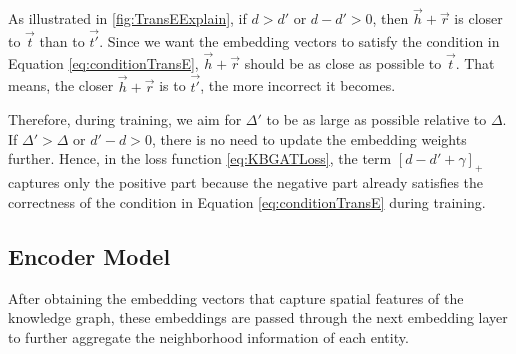 As illustrated in \autoref{fig:TransEExplain}, if $d > d'$ or $d - d' > 0$, then $\overrightarrow{h} + \overrightarrow{r}$ is closer to $\overrightarrow{t}$ than to $\overrightarrow{t'}$. Since we want the embedding vectors to satisfy the condition in Equation \ref{eq:conditionTransE}, $\overrightarrow{h} + \overrightarrow{r}$ should be as close as possible to $\overrightarrow{t}$. That means, the closer $\overrightarrow{h} + \overrightarrow{r}$ is to $\overrightarrow{t'}$, the more incorrect it becomes.

Therefore, during training, we aim for $\Delta'$ to be as large as possible relative to $\Delta$. If $\Delta' > \Delta$ or $d' - d > 0$, there is no need to update the embedding weights further. Hence, in the loss function \ref{eq:KBGATLoss}, the term $[d - d' + \gamma]_{+}$ captures only the positive part because the negative part already satisfies the correctness of the condition in Equation \ref{eq:conditionTransE} during training.



\subsection{Encoder Model}
\label{sec:encodeKBGAT}

After obtaining the embedding vectors that capture spatial features of the knowledge graph, these embeddings are passed through the next embedding layer to further aggregate the neighborhood information of each entity.


